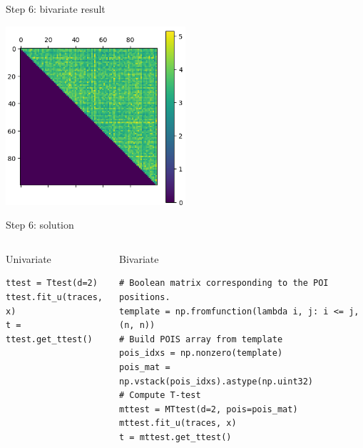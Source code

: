 \documentclass[aspectratio=169]{beamer}
\begin{document}
\begin{frame}{Step 6: bivariate result}
    \begin{center}
        \includegraphics[width=0.5\textwidth]{figures/res_step6b.png}
    \end{center}
\end{frame}

\begin{frame}[containsverbatim]{Step 6: solution}
    \footnotesize
    \begin{columns}
        \begin{column}{0.25\textwidth}
            \begin{center}
                Univariate
            \end{center}
    \begin{verbatim}
ttest = Ttest(d=2)
ttest.fit_u(traces, x)
t = ttest.get_ttest()
    \end{verbatim}
        \end{column}
        \begin{column}{0.7\textwidth}
            \begin{center}
                Bivariate
            \end{center}
    \begin{verbatim}
# Boolean matrix corresponding to the POI positions.
template = np.fromfunction(lambda i, j: i <= j, (n, n))
# Build POIS array from template
pois_idxs = np.nonzero(template)
pois_mat = np.vstack(pois_idxs).astype(np.uint32)
# Compute T-test
mttest = MTtest(d=2, pois=pois_mat)
mttest.fit_u(traces, x)
t = mttest.get_ttest()
    \end{verbatim}
        \end{column}
    \end{columns}
\end{frame}
\end{document}
